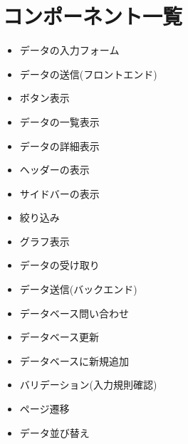 \documentclass[a4paper, titlepage]{jsarticle}
\begin{document}
\section{コンポーネント一覧}
\begin{itemize}
  \item データの入力フォーム
  \item データの送信(フロントエンド)
  \item ボタン表示
  \item データの一覧表示
  \item データの詳細表示
  \item ヘッダーの表示
  \item サイドバーの表示
  \item 絞り込み
  \item グラフ表示
  \item データの受け取り
  \item データ送信(バックエンド)
  \item データベース問い合わせ
  \item データベース更新
  \item データベースに新規追加
  \item バリデーション(入力規則確認)
  \item ページ遷移
  \item データ並び替え
\end{itemize}
\end{document}
